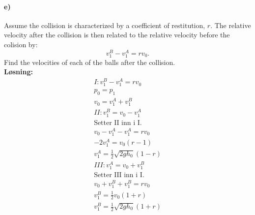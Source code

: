 \documentclass[11pt, A4paper,norsk]{article}
\begin{document}
		\paragraph{e)}
			\begin{flushleft}
Assume the collision is characterized by a coefficient of restitution, $r$. The relative velocity after the collision is then related to the relative velocity before the colision by:
$$v^B_1 - v^A_1 = rv_0.$$
Find the velocities of each of the balls after the collision. \\
\vspace{1mm}
\textbf{Løsning:} \\
\vspace{1mm}
				\begin{align}
I: v_1^B - v_1^A = rv_0 \nonumber \\
p_0 = p_1 \nonumber \\
v_0 = v_1^A + v_1^B \nonumber \\
II: v_1^B = v_0 - v_1^A \nonumber \\
\text{Setter II inn i I.} \nonumber \\
v_0 - v_1^A - v_1^A = rv_0 \nonumber \\
- 2v_1^A = v_0(r - 1) \nonumber \\
v_1^A = \frac{1}{2}\sqrt{2gh_0}(1 - r) \nonumber \\
III: v_1^A = v_0 + v_1^B \nonumber \\
\text{Setter III inn i I.} \nonumber \\
v_0 + v_1^B + v_1^B = rv_0 \nonumber \\
v_1^B = \frac{1}{2}v_0(1 + r) \nonumber \\
v_1^B = \frac{1}{2}\sqrt{2gh_0}(1 + r) \nonumber
				\end{align}
			\end{flushleft}
\end{document}
